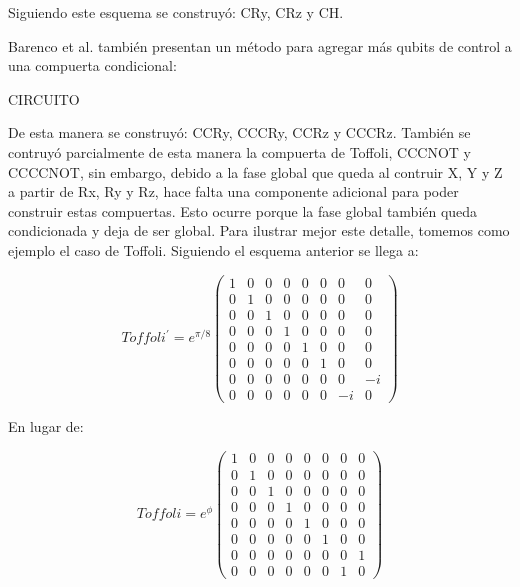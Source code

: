 Siguiendo este esquema se construyó: CRy, CRz y CH.

Barenco et al. también presentan un método para agregar más qubits de control a una compuerta condicional:

CIRCUITO

De esta manera se construyó: CCRy, CCCRy, CCRz y CCCRz. También se contruyó parcialmente de esta manera la compuerta de Toffoli, CCCNOT y CCCCNOT, sin embargo, debido a la fase global que queda al contruir X, Y y Z a partir de Rx, Ry y Rz, hace falta una componente adicional para poder construir estas compuertas. Esto ocurre porque la fase global también queda condicionada y deja de ser global. Para ilustrar mejor este detalle, tomemos como ejemplo el caso de Toffoli. Siguiendo el esquema anterior se llega a:

\begin{equation}
    Toffoli^\prime =
    e^{\pi/8}
    \begin{pmatrix}
        1 & 0 & 0 & 0 & 0 & 0 & 0 & 0 \\
        0 & 1 & 0 & 0 & 0 & 0 & 0 & 0 \\
        0 & 0 & 1 & 0 & 0 & 0 & 0 & 0 \\
        0 & 0 & 0 & 1 & 0 & 0 & 0 & 0 \\
        0 & 0 & 0 & 0 & 1 & 0 & 0 & 0 \\
        0 & 0 & 0 & 0 & 0 & 1 & 0 & 0 \\
        0 & 0 & 0 & 0 & 0 & 0 & 0 & -i \\
        0 & 0 & 0 & 0 & 0 & 0 & -i & 0
    \end{pmatrix}
\end{equation}

En lugar de:

\begin{equation}
    Toffoli =
    e^{\phi}
    \begin{pmatrix}
        1 & 0 & 0 & 0 & 0 & 0 & 0 & 0 \\
        0 & 1 & 0 & 0 & 0 & 0 & 0 & 0 \\
        0 & 0 & 1 & 0 & 0 & 0 & 0 & 0 \\
        0 & 0 & 0 & 1 & 0 & 0 & 0 & 0 \\
        0 & 0 & 0 & 0 & 1 & 0 & 0 & 0 \\
        0 & 0 & 0 & 0 & 0 & 1 & 0 & 0 \\
        0 & 0 & 0 & 0 & 0 & 0 & 0 & 1 \\
        0 & 0 & 0 & 0 & 0 & 0 & 1 & 0
    \end{pmatrix}
\end{equation}

